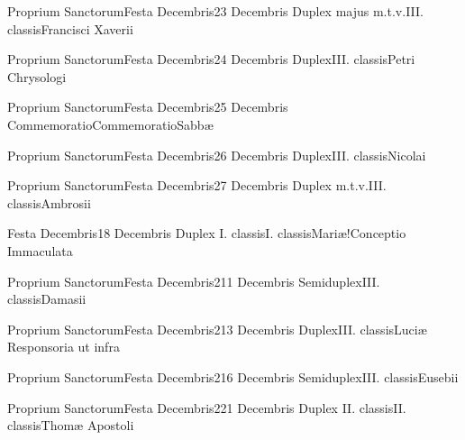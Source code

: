 \documentclass[liber-responsorialis_hiemalis.tex]{subfiles}
\begin{document}
	{Proprium Sanctorum}{Festa Decembris}{2}{3 Decembris}
	{Duplex majus m.t.v.}{III. classis}{Francisci Xaverii}
	{\conprubric}
	{\respdetemp}

	{Proprium Sanctorum}{Festa Decembris}{2}{4 Decembris}
	{Duplex}{III. classis}{Petri Chrysologi}
	{\copodorubric}
	{\respdetemp}

	{Proprium Sanctorum}{Festa Decembris}{2}{5 Decembris}
	{Commemoratio}{Commemoratio}{Sabbæ}
	{}
	{}
\rubric{\respdetemp}

	{Proprium Sanctorum}{Festa Decembris}{2}{6 Decembris}
	{Duplex}{III. classis}{Nicolai}
	{\coporubric}
	{\respdetemp}

	{Proprium Sanctorum}{Festa Decembris}{2}{7 Decembris}
	{Duplex m.t.v.}{III. classis}{Ambrosii}
	{\copodorubric}
	{\respdetemp}

	{Festa Decembris}{1}{8 Decembris}
	{Duplex I. classis}{I. classis}{Mariæ!Conceptio Immaculata}
	{}
	{}


	{Proprium Sanctorum}{Festa Decembris}{2}{11 Decembris}
	{Semiduplex}{III. classis}{Damasii}
	{\coporubric}
	{\respdetemp}


	{Proprium Sanctorum}{Festa Decembris}{2}{13 Decembris}
	{Duplex}{III. classis}{Luciæ}
	{Responsoria ut infra}
	{\respdetemp}
\rubric{\respdetemp}

	{Proprium Sanctorum}{Festa Decembris}{2}{16 Decembris}
	{Semiduplex}{III. classis}{Eusebii}
	{\umexrubric}
	{\respdetemp}

	{Proprium Sanctorum}{Festa Decembris}{2}{21 Decembris}
	{Duplex II. classis}{II. classis}{Thomæ Apostoli}
	{}
	{}
\rubric{\apexrubric}
	
\end{document}
